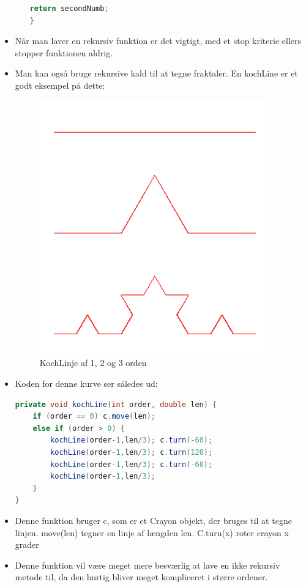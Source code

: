 \documentclass{article}
\begin{document}
\begin{itemize}
\begin{itemize}
\begin{lstlisting}[language=java]
	return secondNumb;
}
\end{lstlisting}	
	\end{itemize} 
	\item Når man laver en rekursiv funktion er det vigtigt, med et stop kriterie ellers stopper funktionen aldrig.
	\item Man kan også bruge rekursive kald til at tegne fraktaler. En kochLine er et godt eksempel på dette:
	\begin{figure}[ht!]
		\centering
		\includegraphics[width=100mm]{img/kockLine.png}
		\caption{KochLinje af 1, 2 og 3 orden  \label{KochLinje}}
	\end{figure}

		\item Koden for denne kurve ser således ud:
\begin{lstlisting}[language=java]
private void kochLine(int order, double len) {
	if (order == 0) c.move(len);
	else if (order > 0) {
		kochLine(order-1,len/3); c.turn(-60);
		kochLine(order-1,len/3); c.turn(120);
		kochLine(order-1,len/3); c.turn(-60);
		kochLine(order-1,len/3);
	}
}
\end{lstlisting}		
	\item Denne funktion bruger c, som er et Crayon objekt, der bruges til at tegne linjen. move(len) tegner en linje af længden len. C.turn(x) roter crayon x grader
	\item Denne funktion vil være meget mere besværlig at lave en ikke rekursiv metode til, da den hurtig bliver meget kompliceret i større ordener.

\end{itemize}
\end{document}
